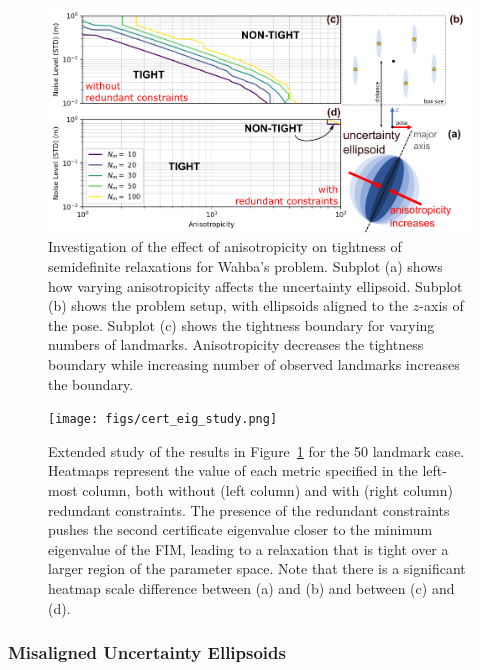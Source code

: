 \documentclass[lettersize,journal]{IEEEtran}
\begin{document}
\begin{figure}[!t]
	\centering
	\includegraphics[width=\columnwidth]{figs/elliposoid_align_fig.png}
	\caption{Investigation of the effect of anisotropicity on tightness of semidefinite relaxations for Wahba's problem.  Subplot (a) shows how varying anisotropicity affects the uncertainty ellipsoid. Subplot (b) shows the problem setup, with ellipsoids aligned to the $z$-axis of the pose. Subplot (c) shows the tightness boundary for varying numbers of landmarks. Anisotropicity decreases the tightness boundary while increasing number of observed landmarks increases the boundary.}
	\label{fig:ellipsoid_align}
\end{figure}


\begin{figure}[!t]
	\centering
	\texttt{[image: figs/cert\_eig\_study.png]}
	\caption{Extended study of the results in Figure~\ref{fig:ellipsoid_align} for the 50 landmark case. Heatmaps represent the value of each metric specified in the left-most column, both without (left column) and with (right column) redundant constraints. The presence of the redundant constraints pushes the second certificate eigenvalue closer to the minimum eigenvalue of the FIM, leading to a relaxation that is tight over a larger region of the parameter space. Note that there is a significant heatmap scale difference between (a) and (b) and between (c) and (d). }
	\label{fig:cert_eig_study}
\end{figure}

\subsubsection{Misaligned Uncertainty Ellipsoids}\label{sec:SimMisalign}
\end{document}

